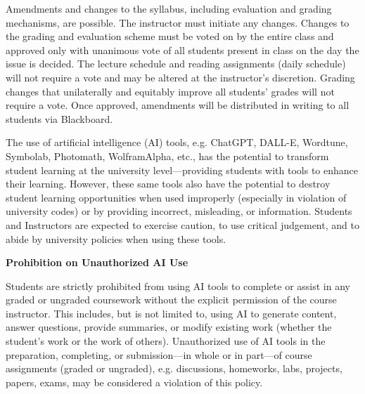 \documentclass[11pt,letterpaper]{article}
\begin{document}

Amendments and changes to the syllabus, including evaluation and grading mechanisms, are possible. The instructor must initiate any changes. Changes to the grading and evaluation scheme must be voted on by the entire class and approved only with unanimous vote of all students present in class on the day the issue is decided. The lecture schedule and reading assignments (daily schedule) will not require a vote and may be altered at the instructor's discretion. Grading changes that unilaterally and equitably improve all students' grades will not require a vote. Once approved, amendments will be distributed in writing to all students via Blackboard. \sectionbreak




The use of artificial intelligence (AI) tools, e.g. ChatGPT, DALL-E, Wordtune, Symbolab, Photomath, WolframAlpha, etc., has the potential to transform student learning at the university level---providing students with tools to enhance their learning. However, these same tools also have the potential to destroy student learning opportunities when used improperly (especially in violation of university codes) or by providing incorrect, misleading, or information. Students and Instructors are expected to exercise caution, to use critical judgement, and to abide by university policies when using these tools. \pspace

{\bfseries Prohibition on Unauthorized AI Use} \par
Students are strictly prohibited from using AI tools to complete or assist in any graded or ungraded coursework without the explicit permission of the course instructor. This includes, but is not limited to, using AI to generate content, answer questions, provide summaries, or modify existing work (whether the student's work or the work of others). Unauthorized use of AI tools in the preparation, completing, or submission---in whole or in part---of course assignments (graded or ungraded), e.g. discussions, homeworks, labs, projects, papers, exams, may be considered a violation of this policy. \pspace





\newpage
\end{document}
